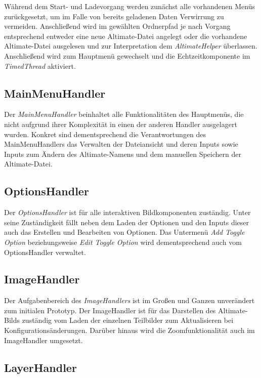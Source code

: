 \documentclass[oneside]{ausarbeitung}
\begin{document}
Während dem Start- und Ladevorgang werden zunächst alle vorhandenen Menüs zurückgesetzt, um im Falle von bereits geladenen Daten Verwirrung zu vermeiden. Anschließend wird im gewählten Ordnerpfad je nach Vorgang entsprechend entweder eine neue Altimate-Datei angelegt oder die vorhandene Altimate-Datei ausgelesen und zur Interpretation dem \textit{AltimateHelper} überlassen. Anschließend wird zum Hauptmenü gewechselt und die Echtzeitkomponente im \textit{TimedThread} aktiviert.



\subsection{MainMenuHandler}

Der \textit{MainMenuHandler} beinhaltet alle Funktionalitäten des Hauptmenüs, die nicht aufgrund ihrer Komplexität in einen der anderen Handler ausgelagert wurden. Konkret sind dementsprechend die Verantwortungen des MainMenuHandlers das Verwalten der Dateiansicht und deren Inputs sowie Inputs zum Ändern des Altimate-Namens und dem manuellen Speichern der Altimate-Datei.



\subsection{OptionsHandler}

Der \textit{OptionsHandler} ist für alle interaktiven Bildkomponenten zuständig. Unter seine Zuständigkeit fällt neben dem Laden der Optionen und den Inputs dieser auch das Erstellen und Bearbeiten von Optionen. Das Untermenü \textit{Add Toggle Option} beziehungsweise \textit{Edit Toggle Option} wird dementsprechend auch vom OptionsHandler verwaltet. 



\subsection{ImageHandler}

Der Aufgabenbereich des \textit{ImageHandlers} ist im Großen und Ganzen unverändert zum initialen Prototyp. Der ImageHandler ist für das Darstellen des Altimate-Bilds zuständig vom Laden der einzelnen Teilbilder zum Aktualisieren bei Konfigurationsänderungen. Darüber hinaus wird die Zoomfunktionalität auch im ImageHandler umgesetzt.



\subsection{LayerHandler}
\end{document}

